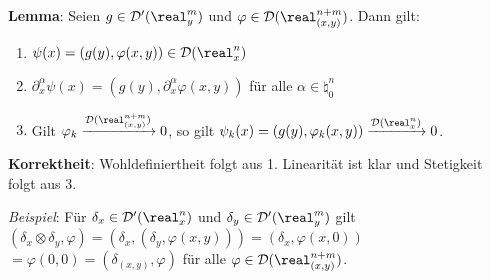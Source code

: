 \textbf{Lemma}:
Seien $g \in \D'(\real^m_y)$ und $\varphi \in \D(\real^{n+m}_{(x,y)})$.
Dann gilt:
\begin{enumerate}
    \item
    $\psi(x) = (g(y), \varphi(x, y)) \in \D(\real^n_x)$

    \item
    $\partial^\alpha_x \psi(x) = (g(y), \partial^\alpha_x \varphi(x, y))$
    für alle $\alpha \in \natural_0^n$

    \item
    Gilt $\varphi_k \xrightarrow{\D(\real^{n+m}_{(x,y)})} 0$, so gilt
    $\psi_k(x) = (g(y), \varphi_k(x, y)) \xrightarrow{\D(\real^n_x)} 0$.
\end{enumerate}

\textbf{Korrektheit}:
Wohldefiniertheit folgt aus 1.
Linearität ist klar und Stetigkeit folgt aus 3.

\emph{Beispiel}:
Für $\delta_x \in \D'(\real^n_x)$ und $\delta_y \in \D'(\real^m_y)$ gilt
$(\delta_x \otimes \delta_y, \varphi) = (\delta_x, (\delta_y, \varphi(x, y))) =
(\delta_x, \varphi(x, 0))$\\
$= \varphi(0, 0) = (\delta_{(x,y)}, \varphi)$
für alle $\varphi \in \D(\real^{n+m}_{(x,y)})$.

\linie

